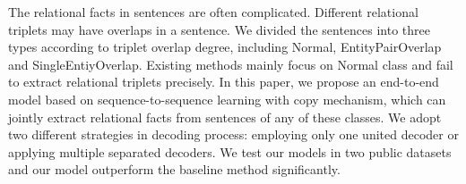 The relational facts in sentences are often complicated. Different relational triplets may have overlaps in a sentence. We divided the sentences into three types according to triplet overlap degree, including Normal, EntityPairOverlap and SingleEntiyOverlap. Existing methods mainly focus on Normal class and fail to extract relational triplets precisely. In this paper, we propose an end-to-end model based on sequence-to-sequence learning with copy mechanism, which can jointly extract relational facts from sentences of any of these classes. We adopt two different strategies in decoding process: employing only one united decoder or applying multiple separated decoders. We test our models in two public datasets and our model outperform the baseline method significantly.
